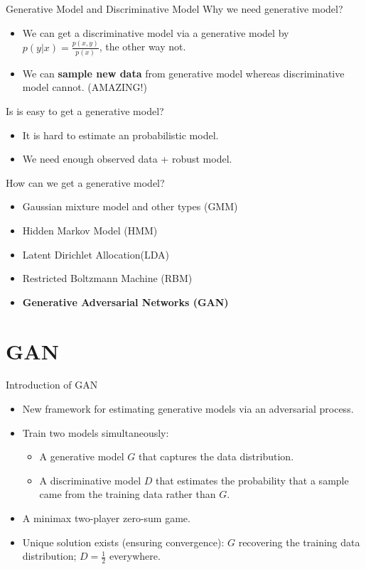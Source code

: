 \documentclass[10pt]{beamer}
\newcommand{\subtitlepage}[3]{\title{#1}\subtitle{#2}\author{#3}\date{}\begin{frame}[plain]\titlepage\end{frame}}
\begin{document}
	\begin{frame}{Generative Model and Discriminative Model}
		Why we need generative model?
		\begin{itemize}
			\item We can get a discriminative model via a generative model by $p(y|x)=\frac{p(x, y)}{p(x)}$, the other way not. 
			\item We can \textbf{sample new data} from generative model whereas discriminative model cannot. (AMAZING!)
		\end{itemize}
		Is is easy to get a generative model?
		\begin{itemize}
			\item It is hard to estimate an probabilistic model.
			\item We need enough observed data + robust model.
		\end{itemize}
		How can we get a generative model?
		\begin{itemize}
			\item Gaussian mixture model and other types (GMM)
			\item Hidden Markov Model (HMM)
			\item Latent Dirichlet Allocation(LDA)
			\item Restricted Boltzmann Machine (RBM)
			\item \textbf{Generative Adversarial Networks (GAN)}
		\end{itemize}
	\end{frame}

	\part{GAN}
	\subtitlepage{}{Generative Adversarial Nets}{Ian J. Goodfellow, Jean Pouget-Abadie, Mehdi Mirza, Bing Xu, \\ David Warde-Farley, Sherjil Ozair, Aaron Courville, Yoshua Bengio. \\ NIPS 2014\\ arXiv: 1406.2661}
	
	\begin{frame}{Introduction of GAN}
		\begin{itemize}
			\item New framework for estimating generative models via an adversarial process.
			\item Train two models simultaneously:
			\begin{itemize}
				\item A generative model $G$ that captures the data distribution.
				\item A discriminative model $D$ that estimates the probability that a sample came from the training data rather than $G$.
			\end{itemize}
			\item A minimax two-player zero-sum game.
			\item Unique solution exists (ensuring convergence): $G$ recovering the training data distribution; $D=\frac{1}{2}$ everywhere.
		\end{itemize}
	\end{frame}
\end{document}

